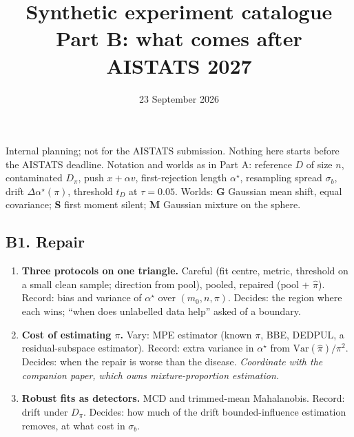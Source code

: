 \documentclass[10pt]{article}
\title{Synthetic experiment catalogue\\ \large Part B: what comes after AISTATS 2027}
\date{23 September 2026}\author{}
\newcommand{\hd}[1]{\textbf{#1}}
\begin{document}
\maketitle

\noindent Internal planning; not for the AISTATS submission. Nothing here starts before the AISTATS deadline. Notation and worlds as in Part A: reference $D$ of size $n$, contaminated $D_\pi$, push $x+\alpha v$, first-rejection length $\alpha^\star$, resampling spread $\sigma_b$, drift $\Delta\alpha^\star(\pi)$, threshold $t_D$ at $\tau=0.05$. Worlds: \hd{G} Gaussian mean shift, equal covariance; \hd{S} first moment silent; \hd{M} Gaussian mixture on the sphere.

\subsection*{B1. Repair}
\begin{enumerate}[leftmargin=*,itemsep=2pt]
\item \hd{Three protocols on one triangle.} Careful (fit centre, metric, threshold on a small clean sample; direction from pool), pooled, repaired (pool + $\hat\pi$). Record: bias and variance of $\alpha^\star$ over $(m_0,n,\pi)$. Decides: the region where each wins; ``when does unlabelled data help'' asked of a boundary.
\item \hd{Cost of estimating $\pi$.} Vary: MPE estimator (known $\pi$, BBE, DEDPUL, a residual-subspace estimator). Record: extra variance in $\alpha^\star$ from $\mathrm{Var}(\hat\pi)/\pi^2$. Decides: when the repair is worse than the disease. \emph{Coordinate with the companion paper, which owns mixture-proportion estimation.}
\item \hd{Robust fits as detectors.} MCD and trimmed-mean Mahalanobis. Record: drift under $D_\pi$. Decides: how much of the drift bounded-influence estimation removes, at what cost in $\sigma_b$.
\end{enumerate}
\end{document}
